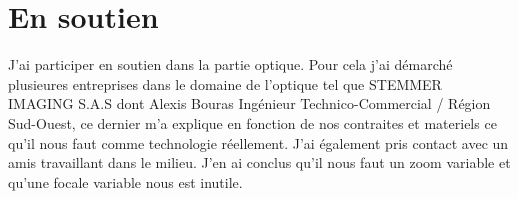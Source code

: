 \section{En soutien}

J'ai participer en soutien dans la partie optique.\newline
Pour cela j'ai démarché plusieures entreprises dans le domaine de l'optique tel que STEMMER IMAGING S.A.S dont Alexis Bouras Ingénieur Technico-Commercial / Région Sud-Ouest, ce dernier m'a explique en fonction de nos contraites et materiels ce qu'il nous faut comme technologie réellement. J'ai également pris contact avec un amis travaillant dans le milieu. \newline
J'en ai conclus qu'il nous faut un zoom variable et qu'une focale variable nous est inutile.


